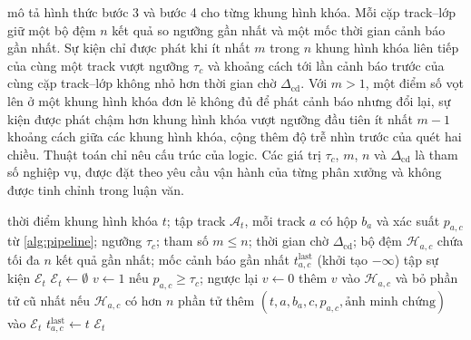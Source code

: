  mô tả hình thức bước 3 và bước 4 cho từng khung hình khóa. Mỗi cặp track--lớp giữ một bộ đệm $n$ kết quả so ngưỡng gần nhất và một mốc thời gian cảnh báo gần nhất. Sự kiện chỉ được phát khi ít nhất $m$ trong $n$ khung hình khóa liên tiếp của cùng một track vượt ngưỡng $\tau_c$ và khoảng cách tới lần cảnh báo trước của cùng cặp track--lớp không nhỏ hơn thời gian chờ $\Delta_{\text{cd}}$. Với $m > 1$, một điểm số vọt lên ở một khung hình khóa đơn lẻ không đủ để phát cảnh báo nhưng đổi lại, sự kiện được phát chậm hơn khung hình khóa vượt ngưỡng đầu tiên ít nhất $m - 1$ khoảng cách giữa các khung hình khóa, cộng thêm độ trễ nhìn trước của quét hai chiều. Thuật toán chỉ nêu cấu trúc của logic. Các giá trị $\tau_c$, $m$, $n$ và $\Delta_{\text{cd}}$ là tham số nghiệp vụ, được đặt theo yêu cầu vận hành của từng phân xưởng và không được tinh chỉnh trong luận văn.

\begin{algorithm}[htbp]
\caption{Logic cảnh báo theo track tại một khung hình khóa}
\label{alg:alert}
\begin{algorithmic}[1]
\Require thời điểm khung hình khóa $t$; tập track $\mathcal{A}_t$, mỗi track $a$ có hộp $b_a$ và xác suất $p_{a,c}$ từ \cref{alg:pipeline}; ngưỡng $\tau_c$; tham số $m \leq n$; thời gian chờ $\Delta_{\text{cd}}$; bộ đệm $\mathcal{H}_{a,c}$ chứa tối đa $n$ kết quả gần nhất; mốc cảnh báo gần nhất $t^{\text{last}}_{a,c}$ (khởi tạo $-\infty$)
\Ensure tập sự kiện $\mathcal{E}_t$
\State $\mathcal{E}_t \gets \emptyset$
  \State $v \gets 1$ nếu $p_{a,c} \geq \tau_c$; ngược lại $v \gets 0$
  \State thêm $v$ vào $\mathcal{H}_{a,c}$ và bỏ phần tử cũ nhất nếu $\mathcal{H}_{a,c}$ có hơn $n$ phần tử
    \State thêm $(t, a, b_a, c, p_{a,c}, \text{ảnh minh chứng})$ vào $\mathcal{E}_t$
    \State $t^{\text{last}}_{a,c} \gets t$
  \EndIf
\EndFor
\State \Return $\mathcal{E}_t$
\end{algorithmic}
\end{algorithm}


